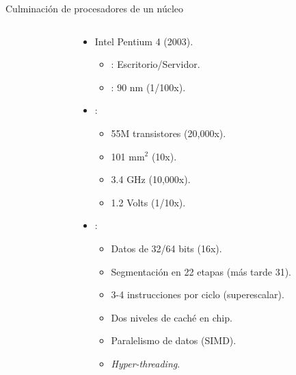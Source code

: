 \begin{frame}[t,shrink=15]{Culminación de procesadores de un núcleo}
\begin{columns}
\begin{column}{.15\textwidth}
\begin{center}
    \end{center}
  \end{column}
  \begin{column}{.7\textwidth}
    \begin{itemize}
      \item Intel Pentium 4 (2003).
        \begin{itemize}
          \item {}: Escritorio/Servidor.
          \item {}: 90 nm (1/100x).
        \end{itemize}
      \item {}:
        \begin{itemize}
          \item 55M transistores (20,000x).
          \item 101 mm$^2$ (10x).
          \item 3.4 GHz (10,000x).
          \item 1.2 Volts (1/10x).
        \end{itemize}
      \item {}:
        \begin{itemize}
          \item Datos de 32/64 bits (16x).
          \item Segmentación en 22 etapas (más tarde 31).
          \item 3-4 instrucciones por ciclo (superescalar).
          \item Dos niveles de caché en chip.
          \item Paralelismo de datos (SIMD).
          \item \emph{Hyper-threading}.
        \end{itemize}
    \end{itemize}
  \end{column}
\end{columns}
\end{frame}

